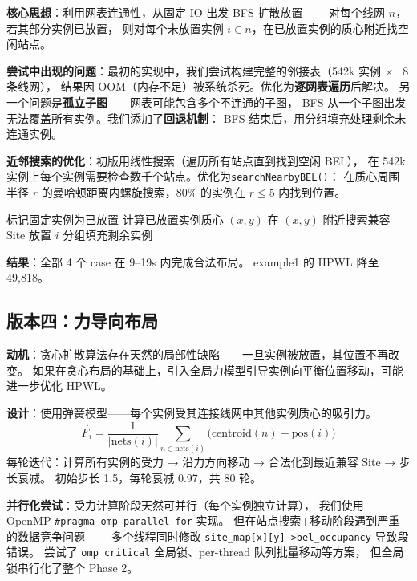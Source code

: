 \documentclass[10.5pt,compsoc]{CjC}
\theoremstyle{mystyle}
\begin{document}
\textbf{核心思想}：利用网表连通性，从固定 IO 出发 BFS 扩散放置——
对每个线网 $n$，若其部分实例已放置，
则对每个未放置实例 $i \in n$，在已放置实例的质心附近找空闲站点。

\textbf{尝试中出现的问题}：最初的实现中，我们尝试构建完整的邻接表（542k 实例 × ~8 条线网），
结果因 OOM（内存不足）被系统杀死。优化为\textbf{逐网表遍历}后解决。
另一个问题是\textbf{孤立子图}——网表可能包含多个不连通的子图，
BFS 从一个子图出发无法覆盖所有实例。我们添加了\textbf{回退机制}：
BFS 结束后，用分组填充处理剩余未连通实例。

\textbf{近邻搜索的优化}：初版用线性搜索（遍历所有站点直到找到空闲 BEL），
在 542k 实例上每个实例需要检查数千个站点。优化为\texttt{searchNearbyBEL()}：
在质心周围半径 $r$ 的曼哈顿距离内螺旋搜索，80\% 的实例在 $r \le 5$ 内找到位置。

\begin{algorithm}[H]
\caption{贪心网表扩散布局}
\begin{algorithmic}[1]
\STATE 标记固定实例为已放置
        \STATE 计算已放置实例质心 $(\bar{x}, \bar{y})$
            \STATE 在 $(\bar{x}, \bar{y})$ 附近搜索兼容 Site
                \STATE 放置 $i$
            \ENDIF
        \ENDFOR
    \ENDFOR
\ENDFOR
\STATE 分组填充剩余实例
\end{algorithmic}
\end{algorithm}

\textbf{结果}：全部 4 个 case 在 9--19s 内完成合法布局。
example1 的 HPWL 降至 49,818。

\subsection{版本四：力导向布局}

\textbf{动机}：贪心扩散算法存在天然的局部性缺陷——一旦实例被放置，其位置不再改变。
如果在贪心布局的基础上，引入全局力模型引导实例向平衡位置移动，可能进一步优化 HPWL。

\textbf{设计}：使用弹簧模型——每个实例受其连接线网中其他实例质心的吸引力。
\begin{equation}
\vec{F}_i = \frac{1}{|\text{nets}(i)|} \sum_{n \in \text{nets}(i)} \bigl(\text{centroid}(n) - \text{pos}(i)\bigr)
\label{eq:force}
\end{equation}
每轮迭代：计算所有实例的受力 → 沿力方向移动 → 合法化到最近兼容 Site → 步长衰减。
初始步长 1.5，每轮衰减 0.97，共 80 轮。

\textbf{并行化尝试}：受力计算阶段天然可并行（每个实例独立计算），
我们使用 OpenMP \texttt{\#pragma omp parallel for} 实现。
但在站点搜索+移动阶段遇到严重的数据竞争问题——
多个线程同时修改 \texttt{site\_map[x][y]->bel\_occupancy} 导致段错误。
尝试了 \texttt{omp critical} 全局锁、per-thread 队列批量移动等方案，
但全局锁串行化了整个 Phase 2。
\end{document}
